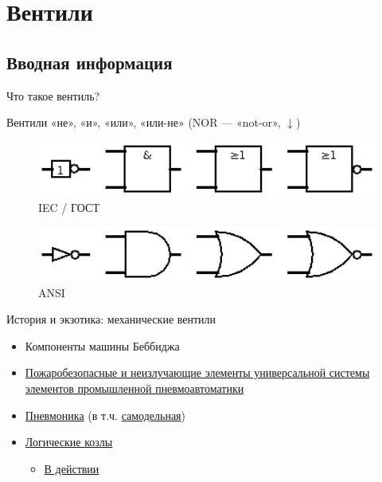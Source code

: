 \documentclass[xetex,aspectratio=43]{beamer}
\begin{document}
\section{Вентили}

\subsection{Вводная информация}

\begin{frame}{Что такое вентиль?}

\pause

Вентили «не», «и», «или», «или-не» (NOR --- «not-or», \(\downarrow\))

\begin{figure}
    \includegraphics[width=1\textwidth]{img/07.gates_IEC.png}
    \caption{IEC / ГОСТ}
\end{figure}


\begin{figure}
    \includegraphics[width=1\textwidth]{img/07.gates_ANSI.png}
    \caption{ANSI}
\end{figure}

\end{frame}

\begin{frame}{История и экзотика: механические вентили}
\begin{itemize}
\item
  Компоненты машины Беббиджа
\item
  \href{http://bse.sci-lib.com/particle017859.html}{Пожаробезопасные и
  неизлучающие элементы универсальной системы элементов промышленной
  пневмоавтоматики}
\item
  \href{https://habr.com/ru/company/ruvds/blog/695210/}{Пневмоника} (в т.ч. \href{https://youtu.be/yvANcR4mQ7M}{самодельная})
\item
  \href{http://www.robives.com/category/product_tags/logic_goats}{Логические
  козлы}

  \begin{itemize}
  \item
    \href{https://youtu.be/vu3o6JNclRQ}{В действии}
  \end{itemize}
\end{itemize}
\end{frame}
\end{document}
